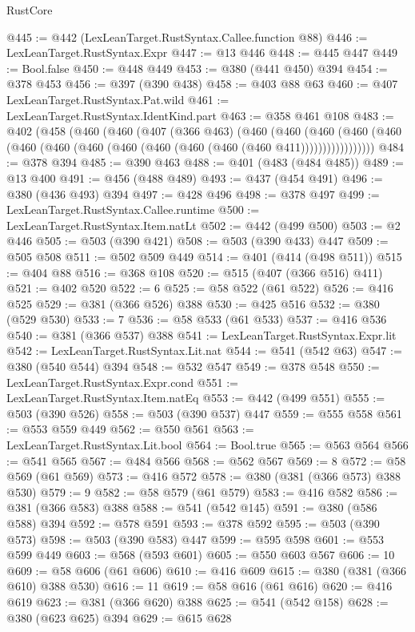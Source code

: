 \begin{lexlean}{RustCore}
\begin{coremodule}
@445 := @442 (LexLeanTarget.RustSyntax.Callee.function @88)
@446 := LexLeanTarget.RustSyntax.Expr
@447 := @13 @446
@448 := @445 @447
@449 := Bool.false
@450 := @448 @449
@453 := @380 (@441 @450) @394
@454 := @378 @453
@456 := @397 (@390 @438)
@458 := @403 @88 @63
@460 := @407 LexLeanTarget.RustSyntax.Pat.wild
@461 := LexLeanTarget.RustSyntax.IdentKind.part
@463 := @358 @461 @108
@483 := @402
    (@458
      (@460
        (@460
          (@407
            (@366 @463)
            (@460
              (@460
                (@460
                  (@460 (@460 (@460 (@460 (@460 (@460 (@460 (@460 (@460 (@460 @411)))))))))))))))))
@484 := @378 @394
@485 := @390 @463
@488 := @401 (@483 (@484 @485))
@489 := @13 @400
@491 := @456 (@488 @489)
@493 := @437 (@454 @491)
@496 := @380 (@436 @493) @394
@497 := @428 @496
@498 := @378 @497
@499 := LexLeanTarget.RustSyntax.Callee.runtime
@500 := LexLeanTarget.RustSyntax.Item.natLt
@502 := @442 (@499 @500)
@503 := @2 @446
@505 := @503 (@390 @421)
@508 := @503 (@390 @433) @447
@509 := @505 @508
@511 := @502 @509 @449
@514 := @401 (@414 (@498 @511))
@515 := @404 @88
@516 := @368 @108
@520 := @515 (@407 (@366 @516) @411)
@521 := @402 @520
@522 := 6
@525 := @58 @522 (@61 @522)
@526 := @416 @525
@529 := @381 (@366 @526) @388
@530 := @425 @516
@532 := @380 (@529 @530)
@533 := 7
@536 := @58 @533 (@61 @533)
@537 := @416 @536
@540 := @381 (@366 @537) @388
@541 := LexLeanTarget.RustSyntax.Expr.lit
@542 := LexLeanTarget.RustSyntax.Lit.nat
@544 := @541 (@542 @63)
@547 := @380 (@540 @544) @394
@548 := @532 @547
@549 := @378 @548
@550 := LexLeanTarget.RustSyntax.Expr.cond
@551 := LexLeanTarget.RustSyntax.Item.natEq
@553 := @442 (@499 @551)
@555 := @503 (@390 @526)
@558 := @503 (@390 @537) @447
@559 := @555 @558
@561 := @553 @559 @449
@562 := @550 @561
@563 := LexLeanTarget.RustSyntax.Lit.bool
@564 := Bool.true
@565 := @563 @564
@566 := @541 @565
@567 := @484 @566
@568 := @562 @567
@569 := 8
@572 := @58 @569 (@61 @569)
@573 := @416 @572
@578 := @380 (@381 (@366 @573) @388 @530)
@579 := 9
@582 := @58 @579 (@61 @579)
@583 := @416 @582
@586 := @381 (@366 @583) @388
@588 := @541 (@542 @145)
@591 := @380 (@586 @588) @394
@592 := @578 @591
@593 := @378 @592
@595 := @503 (@390 @573)
@598 := @503 (@390 @583) @447
@599 := @595 @598
@601 := @553 @599 @449
@603 := @568 (@593 @601)
@605 := @550 @603 @567
@606 := 10
@609 := @58 @606 (@61 @606)
@610 := @416 @609
@615 := @380 (@381 (@366 @610) @388 @530)
@616 := 11
@619 := @58 @616 (@61 @616)
@620 := @416 @619
@623 := @381 (@366 @620) @388
@625 := @541 (@542 @158)
@628 := @380 (@623 @625) @394
@629 := @615 @628

\end{coremodule}
\end{lexlean}
